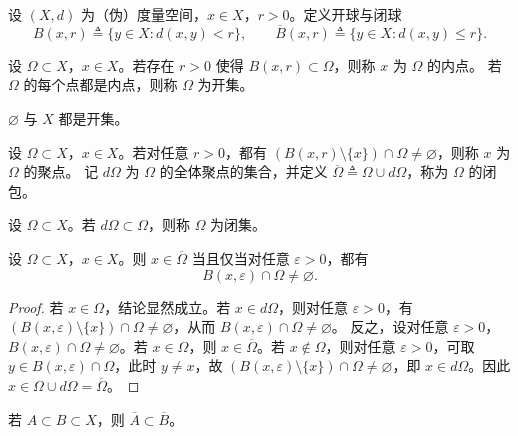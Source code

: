 \documentclass[lang=cn,a4paper,newtx,section]{elegantbook}
\begin{document}
\begin{definition}
  设 $(X,d)$ 为（伪）度量空间，$x\in X$，$r>0$。定义开球与闭球
  \[
    B(x,r)\triangleq \{y\in X: d(x,y)<r\},\qquad
    \overline{B}(x,r)\triangleq \{y\in X: d(x,y)\le r\}.
  \]
\end{definition}

\begin{definition}
  设 $\Omega\subset X$，$x\in X$。若存在 $r>0$ 使得 $B(x,r)\subset \Omega$，则称 $x$ 为 $\Omega$ 的内点。
  若 $\Omega$ 的每个点都是内点，则称 $\Omega$ 为开集。
\end{definition}

\begin{remark}
  $\varnothing$ 与 $X$ 都是开集。
\end{remark}

\begin{definition}
  设 $\Omega\subset X$，$x\in X$。若对任意 $r>0$，都有 $(B(x,r)\setminus\{x\})\cap\Omega\ne\varnothing$，则称 $x$ 为 $\Omega$ 的聚点。
  记 $d\Omega$ 为 $\Omega$ 的全体聚点的集合，并定义 $\overline{\Omega}\triangleq \Omega\cup d\Omega$，称为 $\Omega$ 的闭包。
\end{definition}

\begin{definition}
  设 $\Omega\subset X$。若 $d\Omega\subset \Omega$，则称 $\Omega$ 为闭集。
\end{definition}

\begin{proposition}\label{prop:closure-ball-intersection}
  设 $\Omega\subset X$，$x\in X$。则 $x\in\overline{\Omega}$ 当且仅当对任意 $\varepsilon>0$，都有
  \[
    B(x,\varepsilon)\cap\Omega\ne\varnothing.
  \]
\end{proposition}

\begin{proof}
  若 $x\in\Omega$，结论显然成立。若 $x\in d\Omega$，则对任意 $\varepsilon>0$，有 $(B(x,\varepsilon)\setminus\{x\})\cap\Omega\ne\varnothing$，从而 $B(x,\varepsilon)\cap\Omega\ne\varnothing$。
  反之，设对任意 $\varepsilon>0$，$B(x,\varepsilon)\cap\Omega\ne\varnothing$。若 $x\in\Omega$，则 $x\in\overline{\Omega}$。若 $x\notin\Omega$，则对任意 $\varepsilon>0$，可取 $y\in B(x,\varepsilon)\cap\Omega$，此时 $y\ne x$，故 $(B(x,\varepsilon)\setminus\{x\})\cap\Omega\ne\varnothing$，即 $x\in d\Omega$。因此 $x\in\Omega\cup d\Omega=\overline{\Omega}$。
\end{proof}

\begin{proposition}\label{prop:closure-monotonicity}
  若 $A\subset B\subset X$，则 $\overline{A}\subset \overline{B}$。
\end{proposition}
\end{document}
